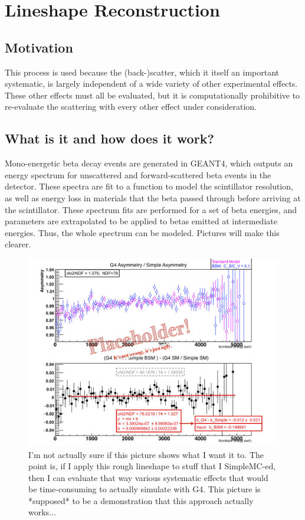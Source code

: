 \section{Lineshape Reconstruction}
	\subsection{Motivation}
	This process is used because the (back-)scatter, which it itself an important systematic, is largely independent of a wide variety of other experimental effects.  These other effects must all be evaluated, but it is computationally prohibitive to re-evaluate the scattering with every other effect under consideration.
	
	\subsection{What is it and how does it work?}
	Mono-energetic beta decay events are generated in GEANT4, which outputs an energy spectrum for unscattered and forward-scattered beta events in the detector.  These spectra are fit to a function to model the scintillator resolution, as well as energy loss in materials that the beta passed through before arriving at the scintillator.  These spectrum fits are performed for a set of beta energies, and parameters are extrapolated to be applied to betas emitted at intermediate energies.  Thus, the whole spectrum can be modeled.  Pictures will make this clearer. 
	
    \begin{figure}[h!!!t]
    	\centering
    	\includegraphics[width=.999\linewidth]
    	{Figures/LineshapeDemo_prelim.png}
    	\caption[Lineshape Comparison]{I'm not actually sure if this picture shows what I want it to.  The point is, if I apply this rough lineshape to stuff that I SimpleMC-ed, then I can evaluate that way various systematic effects that would be time-consuming to actually simulate with G4.  This picture is  *supposed* to be a demonstration that this approach actually works... }	
    	\label{fig:lineshape_demo}
    \end{figure}
	

